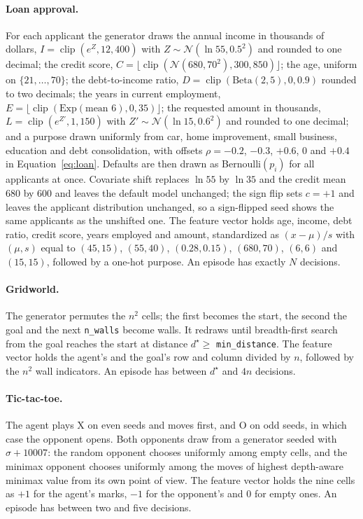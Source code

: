 \paragraph{Loan approval.}
For each applicant the generator draws the annual income in thousands of dollars, $I=\operatorname{clip}(e^{Z},12,400)$ with $Z\sim\mathcal{N}(\ln 55, 0.5^2)$ and rounded to one decimal; the credit score, $C=\lfloor\operatorname{clip}(\mathcal{N}(680,70^2),300,850)\rfloor$; the age, uniform on $\{21,\dots,70\}$; the debt-to-income ratio, $D=\operatorname{clip}(\mathrm{Beta}(2,5),0,0.9)$ rounded to two decimals; the years in current employment, $E=\lfloor\operatorname{clip}(\mathrm{Exp}(\text{mean } 6),0,35)\rfloor$; the requested amount in thousands, $L=\operatorname{clip}(e^{Z'},1,150)$ with $Z'\sim\mathcal{N}(\ln 15, 0.6^2)$ and rounded to one decimal; and a purpose drawn uniformly from car, home improvement, small business, education and debt consolidation, with offsets $\rho=-0.2$, $-0.3$, $+0.6$, $0$ and $+0.4$ in Equation~\eqref{eq:loan}. Defaults are then drawn as Bernoulli$(p_i)$ for all applicants at once. Covariate shift replaces $\ln 55$ by $\ln 35$ and the credit mean 680 by 600 and leaves the default model unchanged; the sign flip sets $c=+1$ and leaves the applicant distribution unchanged, so a sign-flipped seed shows the same applicants as the unshifted one. The feature vector holds age, income, debt ratio, credit score, years employed and amount, standardized as $(x-\mu)/s$ with $(\mu,s)$ equal to $(45,15)$, $(55,40)$, $(0.28,0.15)$, $(680,70)$, $(6,6)$ and $(15,15)$, followed by a one-hot purpose. An episode has exactly $N$ decisions.

\paragraph{Gridworld.}
The generator permutes the $n^2$ cells; the first becomes the start, the second the goal and the next \texttt{n\_walls} become walls. It redraws until breadth-first search from the goal reaches the start at distance $d^\star\ge$ \texttt{min\_distance}. The feature vector holds the agent's and the goal's row and column divided by $n$, followed by the $n^2$ wall indicators. An episode has between $d^\star$ and $4n$ decisions.

\paragraph{Tic-tac-toe.}
The agent plays X on even seeds and moves first, and O on odd seeds, in which case the opponent opens. Both opponents draw from a generator seeded with $\sigma+10007$: the random opponent chooses uniformly among empty cells, and the minimax opponent chooses uniformly among the moves of highest depth-aware minimax value from its own point of view. The feature vector holds the nine cells as $+1$ for the agent's marks, $-1$ for the opponent's and 0 for empty ones. An episode has between two and five decisions.

